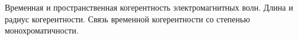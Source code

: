 \documentclass[__main__.tex]{subfiles}
\begin{document}
Временная и пространственная когерентность электромагнитных волн. Длина и радиус когерентности. Связь временной когерентности со степенью монохроматичности.\\ 

\end{document}
